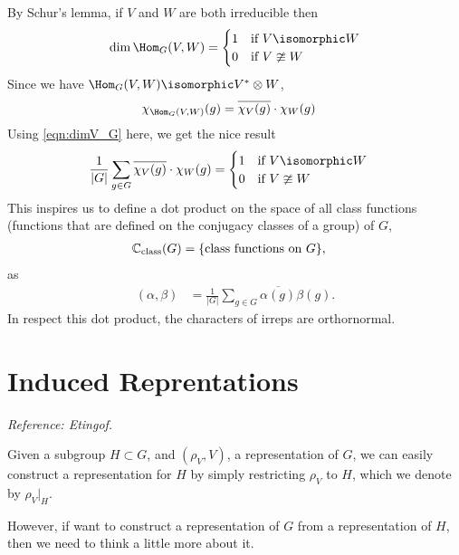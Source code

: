 By Schur's lemma, if $V$ and $W$ are both irreducible then
\begin{equation}
    \dim \Hom_G(V,W) = 
        \begin{cases}    
            1   &\text{if } V\isomorphic W \\
            0   &\text{if } V\ncong  W
        \end{cases}
\end{equation}
Since we have $\Hom_G(V,W)\isomorphic V^*\otimes W$,
\begin{align}
    \chi_{\Hom_G(V,W)}(g) &= \overline{\chi_V(g)}\cdot\chi_W(g)
\end{align}
Using \eqref{eqn:dimV_G} here, we get the nice result
\begin{align}
        \frac{1}{|G|}\sum_{g\in G} \overline{\chi_V(g)}\cdot\chi_W(g) 
        &= \begin{cases}    
            1   &\text{if } V\isomorphic W \\
            0   &\text{if } V\ncong  W
        \end{cases}
\end{align}
This inspires us to define a dot product on the space of all class functions (functions that are defined on the conjugacy classes of a group) of $G$,
\begin{align}
    \mathbb{C}_{\text{class}}(G) &= \{\text{class functions on $G$}\},
\end{align}
as
\begin{align}
    (\alpha,\beta) &= \frac{1}{|G|} \sum_{g\in G} \overline{\alpha(g)} \beta(g).
    \label{eqn:dotproduct_classfunctions}
\end{align}
In respect this dot product, the characters of irreps are orthornormal.

\chapter{Induced Reprentations}
\label{cha:induced_reprentations}
\emph{Reference: Etingof.}

Given a subgroup $H\subset G$, and $(\rho_V, V)$, a representation of $G$, we can easily construct a representation for $H$ by simply restricting $\rho_V$ to $H$, which we denote by $\rho_V|_H$.

However, if want to construct a representation of $G$ from a representation of $H$, then we need to think a little more about it. 

